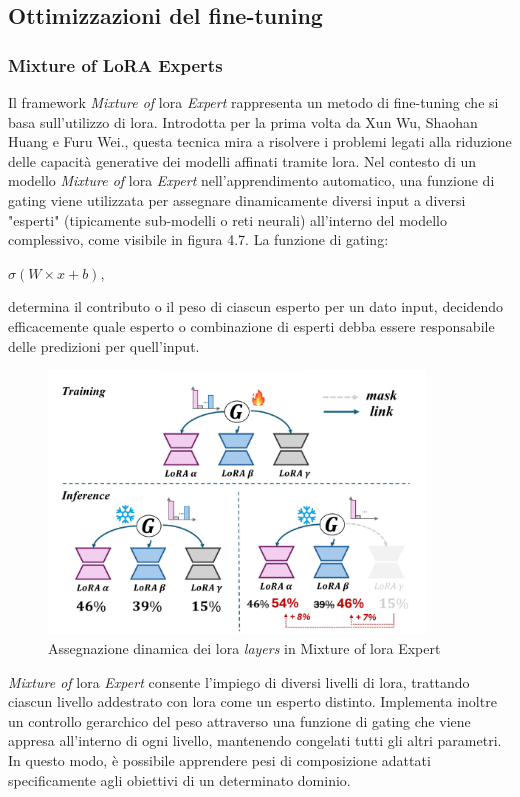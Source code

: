         \subsection{Ottimizzazioni del fine-tuning}
        \subsubsection{Mixture of LoRA Experts}
        Il framework \textit{Mixture of} \gls{lora} \textit{Expert} rappresenta un metodo di \gls{fine-tuning} che si basa sull'utilizzo di \gls{lora}. Introdotta per la prima volta da Xun Wu, Shaohan Huang e Furu Wei.\cite{article:Wu2024MixtureOL}, questa tecnica mira a risolvere i problemi legati alla riduzione delle capacità generative dei modelli affinati tramite \gls{lora}.
        Nel contesto di un modello \textit{Mixture of} \gls{lora} \textit{Expert} nell'apprendimento automatico, una funzione di gating viene utilizzata per assegnare dinamicamente diversi input a diversi "esperti" (tipicamente sub-modelli o reti neurali) all'interno del modello complessivo, come visibile in figura 4.7. La funzione di gating:\\
        \centerline{$ \sigma(W\times x + b)$,} determina il contributo o il peso di ciascun esperto per un dato input, decidendo efficacemente quale esperto o combinazione di esperti debba essere responsabile delle predizioni per quell'input.\\
        \begin{figure}[htp]
            \centering        
            \includegraphics[width=10cm]{img/MoE2.pdf}
            \caption{Assegnazione dinamica dei \gls{lora} \textit{layers} in Mixture of \gls{lora} Expert}
        \end{figure}
       \newpage\textit{Mixture of} \gls{lora} \textit{Expert} consente l'impiego di diversi livelli di \gls{lora}, trattando ciascun livello addestrato con \gls{lora} come un esperto distinto. Implementa inoltre un controllo gerarchico del peso attraverso una funzione di gating che viene appresa all'interno di ogni livello, mantenendo congelati tutti gli altri parametri. In questo modo, è possibile apprendere pesi di composizione adattati specificamente agli obiettivi di un determinato dominio.

